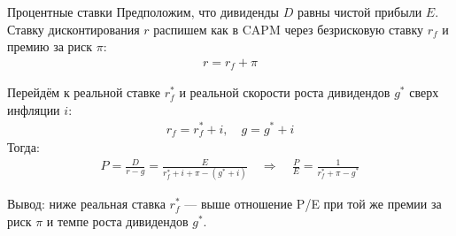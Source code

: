 \documentclass{beamer}
\begin{document}
\begin{frame}{Процентные ставки}
\justify
Предположим, что дивиденды $D$ равны чистой прибыли $E$. Ставку дисконтирования 
$r$ распишем как в CAPM через безрисковую ставку $r_f$ и премию за риск $\pi$:
\begin{align*}
r = r_f + \pi
\end{align*}

\justify
Перейдём к реальной ставке $r_f^*$ и реальной скорости роста дивидендов $g^*$
сверх инфляции $i$:
\begin{align*}
r_f = r_f^* + i, \quad g = g^* + i
\end{align*}
Тогда:
\begin{align*}
P = \frac{D}{r - g} = \frac{E}{r_f^* + i + \pi - (g^* + i)} 
\quad\Rightarrow\quad \frac{P}{E} = \frac{1}{r_f^* + \pi - g^*}
\end{align*}

\justify
Вывод: ниже реальная ставка $r_f^*$ --- выше отношение P/E при той же премии за 
риск $\pi$ и темпе роста дивидендов $g^*$.
\end{frame}



\newcommand{\plotThickAxis}[1]{
        \draw[very thick]
        (axis cs:1880-01-01, #1) -- (axis cs: 2050-01-01, #1);   
}

\newcommand{\plotThickZeroAxis}{
    \plotThickAxis{0}
}
\end{document}
